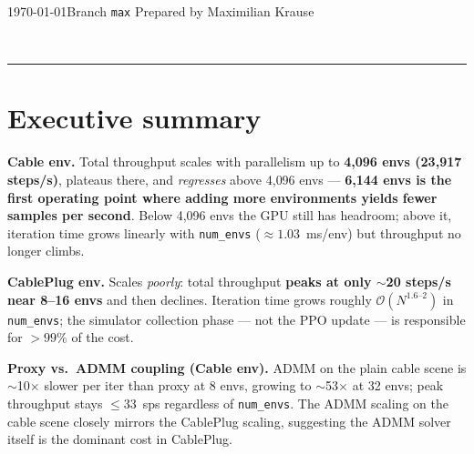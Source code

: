 \documentclass[11pt,a4paper]{article}
\renewcommand{\headrulewidth}{0pt}
\begin{document}
\thispagestyle{plain}
\fancypagestyle{plain}{%
  \fancyhf{}%
  \renewcommand{\headrulewidth}{0pt}%
  \fancyfoot[C]{\footnotesize\textcolor{nvgrey}{\thepage}}%
}

\vspace*{1.0cm}

\noindent\textcolor{nvgrey}{\small \today \quad\textbar\quad Branch \texttt{max} \quad\textbar\quad Prepared by Maximilian Krause}
\vspace{0.3em}

\\[0.2em]
\vspace{1.0em}

\noindent\textcolor{nvrule}{\rule{\linewidth}{0.6pt}}

\section*{\textcolor{nvgreen}{Executive summary}}

\begin{keybox}
\sffamily
\textbf{Cable env.} Total throughput scales with parallelism up to
\textbf{4{,}096 envs (23{,}917 steps/s)}, plateaus there, and \emph{regresses}
above 4{,}096 envs --- \textbf{6{,}144 envs is the first operating point where
adding more environments yields fewer samples per second}. Below 4{,}096 envs
the GPU still has headroom; above it, iteration time grows linearly with
\texttt{num\_envs} ($\approx 1.03$~ms/env) but throughput no longer climbs.

\medskip
\textbf{CablePlug env.} Scales \emph{poorly}: total throughput
\textbf{peaks at only $\sim$20 steps/s near 8--16 envs} and then declines.
Iteration time grows roughly $\mathcal{O}(N^{1.6\text{--}2})$ in
\texttt{num\_envs}; the simulator collection phase --- not the PPO update ---
is responsible for $>99\%$ of the cost.

\medskip
\textbf{Proxy vs.\ ADMM coupling (Cable env).} ADMM on the plain cable
scene is $\sim$10$\times$ slower per iter than proxy at 8 envs, growing to
$\sim$53$\times$ at 32 envs; peak throughput stays $\leq$33~sps regardless
of \texttt{num\_envs}. The ADMM scaling on the cable scene closely mirrors
the CablePlug scaling, suggesting the ADMM solver itself is the dominant
cost in CablePlug.
\end{keybox}
\end{document}
